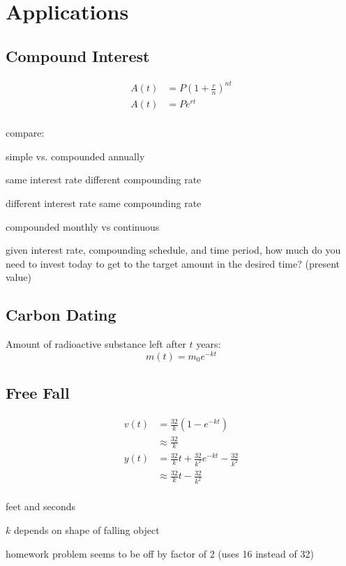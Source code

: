 \documentclass{exam}
\begin{document}
  \section{Applications}

  \subsection{Compound Interest}
  \begin{align*}
    A(t) &= P \left( 1 + \frac{r}{n} \right)^{nt} \\
    A(t) &= P e^{rt} \\
  \end{align*}

  compare:
  \begin{itemize*}
    \item simple vs. compounded annually
    \item same interest rate different compounding rate
    \item different interest rate same compounding rate
    \item compounded monthly vs continuous
    \item given interest rate, compounding schedule, and time period, how much do you need to invest today to get to the
      target amount in the desired time? (present value)
  \end{itemize*}

  \subsection{Carbon Dating}

  Amount of radioactive substance left after $t$ years:
  \[
    m(t) = m_0 e^{-kt}
  \]

  \subsection{Free Fall}

  \begin{align*}
    v(t) &= \frac{32}{k} \left( 1 - e^{-kt} \right) \\
         &\approx \frac{32}{k} \\
    y(t) &= \frac{32}{k} t + \frac{32}{k^2} e^{-kt} - \frac{32}{k^2} \\
         &\approx \frac{32}{k} t - \frac{32}{k^2} \\
  \end{align*}

  \begin{itemize*}
    \item feet and seconds
    \item $k$ depends on shape of falling object
    \item homework problem seems to be off by factor of 2 (uses 16 instead of 32)
  \end{itemize*}
\end{document}
